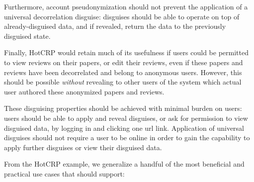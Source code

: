 Furthermore, account pseudonymization should not prevent the application of a universal
decorrelation disguise: disguises should be able to operate on top of already-disguised data, and if
revealed, return the data to the previously disguised state. 

Finally, HotCRP would retain much of its usefulness if users could be permitted to view
reviews on their papers, or edit their reviews, even if these papers and reviews have been
decorrelated and belong to anonymous users.
However, this should be possible \emph{without} revealing to other users of the system which
actual user authored these anonymized papers and reviews.

 These disguising properties should be achieved with minimal burden on
users: users should be able to apply and reveal disguises, or ask for permission to view
disguised data, by \eg logging in and clicking one url link. Application of universal disguises
should not require a user to be online in order to gain the capability to apply further disguises or
view their disguised data.

From the HotCRP example, we generalize a handful of the most beneficial and practical use cases
that \sys should support:

